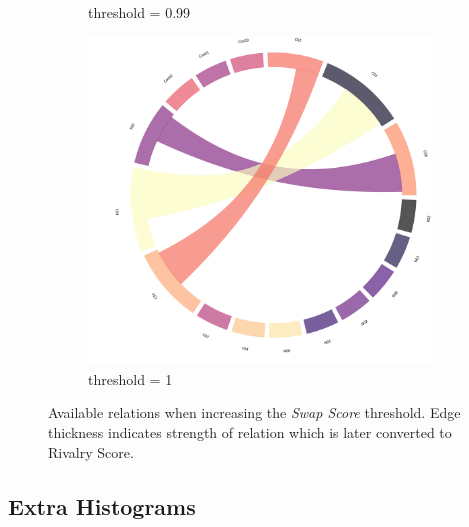\begin{figure}[!ht]
\begin{subfigure}[b]{0.3\linewidth}
		\caption{threshold = 0.99}
	\end{subfigure}
	\hfill
	\begin{subfigure}[b]{0.3\linewidth}
		\includegraphics[width=\linewidth]{figures/chords/chord_swap_Ensemble1000_RCN53333001.png}
		\caption{threshold = 1}
	\end{subfigure}
	\caption{Available relations when increasing the \emph{Swap Score} threshold. Edge thickness indicates strength of relation which is later converted to Rivalry Score.}
	\label{fig:six-chords}
\end{figure}
\FloatBarrier

\subsection{Extra Histograms}
\label{section:suppl:extra-hist}

